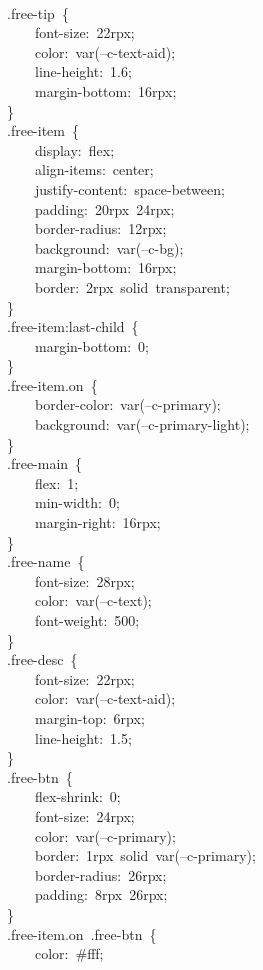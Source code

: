 \documentclass[a4paper,10pt]{article}
\begin{document}
{\ttfamily\footnotesize\raggedright
\mbox{}\\
~~~~.free-tip~\{\\
~~~~~~~~font-size:~22rpx;\\
~~~~~~~~color:~var(--c-text-aid);\\
~~~~~~~~line-height:~1.6;\\
~~~~~~~~margin-bottom:~16rpx;\\
~~~~\}\\
~~~~.free-item~\{\\
~~~~~~~~display:~flex;\\
~~~~~~~~align-items:~center;\\
~~~~~~~~justify-content:~space-between;\\
~~~~~~~~padding:~20rpx~24rpx;\\
~~~~~~~~border-radius:~12rpx;\\
~~~~~~~~background:~var(--c-bg);\\
~~~~~~~~margin-bottom:~16rpx;\\
~~~~~~~~border:~2rpx~solid~transparent;\\
~~~~\}\\
~~~~.free-item:last-child~\{\\
~~~~~~~~margin-bottom:~0;\\
~~~~\}\\
~~~~.free-item.on~\{\\
~~~~~~~~border-color:~var(--c-primary);\\
~~~~~~~~background:~var(--c-primary-light);\\
~~~~\}\\
~~~~.free-main~\{\\
~~~~~~~~flex:~1;\\
~~~~~~~~min-width:~0;\\
~~~~~~~~margin-right:~16rpx;\\
~~~~\}\\
~~~~.free-name~\{\\
~~~~~~~~font-size:~28rpx;\\
~~~~~~~~color:~var(--c-text);\\
~~~~~~~~font-weight:~500;\\
~~~~\}\\
~~~~.free-desc~\{\\
~~~~~~~~font-size:~22rpx;\\
~~~~~~~~color:~var(--c-text-aid);\\
~~~~~~~~margin-top:~6rpx;\\
~~~~~~~~line-height:~1.5;\\
~~~~\}\\
~~~~.free-btn~\{\\
~~~~~~~~flex-shrink:~0;\\
~~~~~~~~font-size:~24rpx;\\
~~~~~~~~color:~var(--c-primary);\\
~~~~~~~~border:~1rpx~solid~var(--c-primary);\\
~~~~~~~~border-radius:~26rpx;\\
~~~~~~~~padding:~8rpx~26rpx;\\
~~~~\}\\
~~~~.free-item.on~.free-btn~\{\\
~~~~~~~~color:~\#fff;
}
\end{document}
